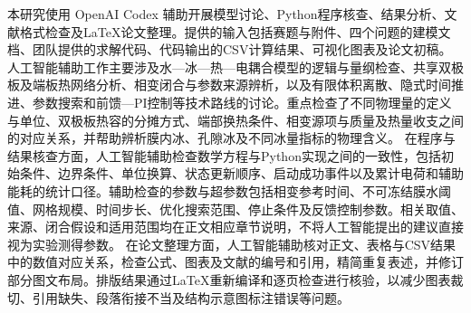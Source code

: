 \documentclass[bwprint]{gmcmthesis}
\numberwithin{equation}{section}
\numberwithin{figure}{section}
\begin{document}
本研究使用 OpenAI Codex 辅助开展模型讨论、Python程序核查、结果分析、文献格式检查及LaTeX论文整理。提供的输入包括赛题与附件、四个问题的建模文档、团队提供的求解代码、代码输出的CSV计算结果、可视化图表及论文初稿。
人工智能辅助工作主要涉及水—冰—热—电耦合模型的逻辑与量纲检查、共享双极板及端板热网络分析、相变闭合与参数来源辨析，以及有限体积离散、隐式时间推进、参数搜索和前馈—PI控制等技术路线的讨论。重点检查了不同物理量的定义与单位、双极板热容的分摊方式、端部换热条件、相变源项与质量及热量收支之间的对应关系，并帮助辨析膜内冰、孔隙冰及不同冰量指标的物理含义。
在程序与结果核查方面，人工智能辅助检查数学方程与Python实现之间的一致性，包括初始条件、边界条件、单位换算、状态更新顺序、启动成功事件以及累计电荷和辅助能耗的统计口径。辅助检查的参数与超参数包括相变参考时间、不可冻结膜水阈值、网格规模、时间步长、优化搜索范围、停止条件及反馈控制参数。相关取值、来源、闭合假设和适用范围均在正文相应章节说明，不将人工智能提出的建议直接视为实验测得参数。
在论文整理方面，人工智能辅助核对正文、表格与CSV结果中的数值对应关系，检查公式、图表及文献的编号和引用，精简重复表述，并修订部分图文布局。排版结果通过LaTeX重新编译和逐页检查进行核验，以减少图表裁切、引用缺失、段落衔接不当及结构示意图标注错误等问题。
\end{document}
